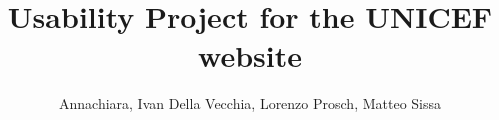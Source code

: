 \documentclass[a4paper,12pt]{article}
\author{Annachiara, Ivan Della Vecchia, Lorenzo Prosch, Matteo Sissa}
\title{Usability Project for the UNICEF website}
\newcommand{\inspectionDir}{root/1.Inspection/}
\newcommand{\utDir}{root/2.UserTesting/}
\newcommand{\conclusionDir}{root/3.Conclusion/}
\newcommand{\annexDir}{root/4.Annex/}
\begin{document}
	\maketitle
	\clearpage
	\tableofcontents
	
	\setlength{\tabcolsep}{1.5cm}
	\renewcommand{\arraystretch}{1.65}
	
	\renewcommand{\rmdefault}{phv}
	\renewcommand{\normalsize}{\fontsize{14}{17.4}\selectfont}
	
	
	
	
	
	
	
\end{document}
